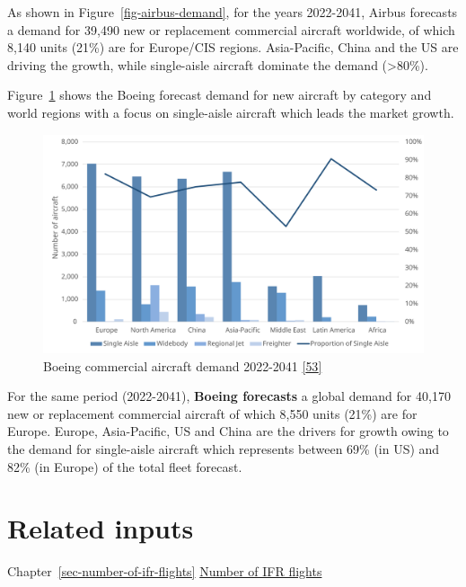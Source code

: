 \documentclass[
  11pt,
  a4paper,
]{book}
\begin{document}
As shown in Figure~\ref{fig-airbus-demand}, for the years 2022-2041,
Airbus forecasts a demand for 39,490 new or replacement commercial
aircraft worldwide, of which 8,140 units (21\%) are for Europe/CIS
regions. Asia-Pacific, China and the US are driving the growth, while
single-aisle aircraft dominate the demand (\textgreater80\%).

Figure~\ref{fig-boeing-demand} shows the Boeing forecast demand for new
aircraft by category and world regions with a focus on single-aisle
aircraft which leads the market growth.

\begin{figure}

{\centering \includegraphics{chapters/../figures/boeing_demand.svg}

}

\caption{\label{fig-boeing-demand}Boeing commercial aircraft demand
2022-2041 \protect\hyperlink{ref-boeingcmf2022}{{[}53{]}}}

\end{figure}

For the same period (2022-2041), \textbf{Boeing forecasts} a global
demand for 40,170 new or replacement commercial aircraft of which 8,550
units (21\%) are for Europe. Europe, Asia-Pacific, US and China are the
drivers for growth owing to the demand for single-aisle aircraft which
represents between 69\% (in US) and 82\% (in Europe) of the total fleet
forecast.

\hypertarget{related-inputs-18}{%
\section{Related inputs}\label{related-inputs-18}}

Chapter~\ref{sec-number-of-ifr-flights}
\protect\hyperlink{sec-number-of-ifr-flights}{Number of IFR flights}
\end{document}
